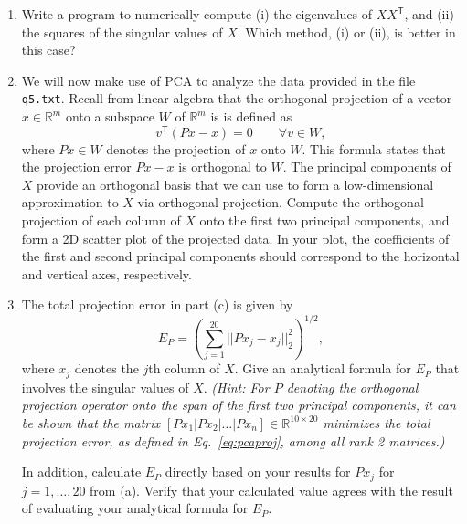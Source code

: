 \documentclass[11pt]{article}
\newcommand{\R}{\mathbb{R}}
\newcommand{\Trans}{\mathsf{T}}
\begin{document}
\begin{enumerate}
\begin{enumerate}
\begin{equation}
\begin{array}{ccccc}
	    1 & 10^{-8} & 0 & 0 & 0 \\
	    1 & 0 & 10^{-8} & 0 & 0 \\
	    1 & 0 & 0 & 10^{-8} & 0 \\
	    1 & 0 & 0 & 0 & 10^{-8}
	  \end{array}
	  \right].
	\end{equation}
	What are the exact eigenvalues of $XX^\Trans$? You can either find
	these by hand, or you can make use of a symbolic computing environment
	like Mathematica or Maple.
      \item Write a program to numerically compute (i) the eigenvalues of
	$XX^\Trans$, and (ii) the squares of the singular values of $X$.
	Which method, (i) or (ii), is better in this case?
      \item We will now make use of PCA to analyze the data provided in the file \texttt{q5.txt}. Recall from linear algebra that the orthogonal projection of a vector $x \in \R^m$ onto a subspace $W$ of $\R^m$ is is defined as
	\begin{equation}
	  v^\Trans(Px-x) = 0 \qquad \forall v \in W,
	\end{equation}
	where $Px \in W$ denotes the projection of $x$ onto $W$. This formula
	states that the projection error $Px - x$ is orthogonal to $W$. The
	principal components of $X$ provide an orthogonal basis that we can use
	to form a low-dimensional approximation to $X$ via orthogonal
	projection. Compute the orthogonal projection of each column of $X$
	onto the first two principal components, and form a 2D scatter plot of
	the projected data. In your plot, the coefficients of the first and
	second principal components should correspond to the horizontal and
	vertical axes, respectively.
      \item The total projection error in part (c) is given by
	\begin{equation}
	  E_P = \left( \sum_{j=1}^{20} ||Px_j - x_j||_2^2 \right)^{1/2},
	  \label{eq:pcaproj}
	\end{equation}
	where $x_j$ denotes the $j$th column of $X$. Give an analytical formula
	for $E_P$ that involves the singular values of $X$. {\it (Hint: For $P$
	denoting the orthogonal projection operator onto the span of the first
	two principal components, it can be shown that the matrix $[Px_1 | Px_2
	| \dots | Px_n] \in \R^{10\times20}$ minimizes the total projection
	error, as defined in Eq.~\ref{eq:pcaproj}, among all rank 2 matrices.)}

	In addition, calculate $E_P$ directly based on your results for $P x_j$
	for $j = 1, \ldots , 20$ from (a). Verify that your calculated value
	agrees with the result of evaluating your analytical formula for $E_P$.
    \end{enumerate}
\end{enumerate}
\end{document}
